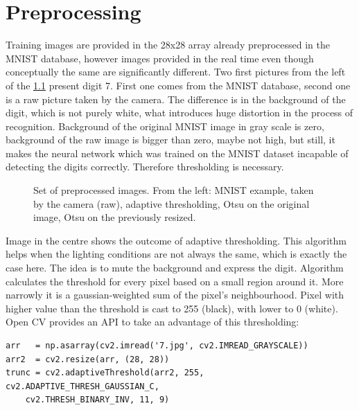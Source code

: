 \begingroup
\renewcommand{\cleardoublepage}{}
\renewcommand{\clearpage}{}
\chapter{Preprocessing}
\endgroup
Training images are provided in the 28x28 array already preprocessed in the MNIST database, however images provided in the real time even though conceptually the same are significantly different. Two first pictures from the left of the \figurename{} \ref{fig:7_images} present digit 7. First one comes from the MNIST database, second one is a raw picture taken by the camera. The difference is in the background of the digit, which is not purely white, what introduces huge distortion in the process of recognition. Background of the original MNIST image in gray scale is zero, background of the raw image is bigger than zero, maybe not high, but still, it makes the neural network which was trained on the MNIST dataset incapable of detecting the digits correctly. Therefore thresholding is necessary.
\begin{figure}[H]
	\begin{center}
	\end{center}
	\caption{Set of preprocessed images. From the left: MNIST example, taken by the camera (raw), adaptive thresholding, Otsu on the original image, Otsu on the previously resized.}
	\label{fig:7_images}
\end{figure}
Image in the centre shows the outcome of adaptive thresholding. This algorithm helps when the lighting conditions are not always the same, which is exactly the case here. The idea is to mute the background and express the digit. Algorithm calculates the threshold for every pixel based on a small region around it. More narrowly it is a gaussian-weighted sum of the pixel's neighbourhood. Pixel with higher value than the threshold is cast to 255 (black), with lower to 0 (white). Open CV provides an API to take an advantage of this thresholding:
\begin{verbatim}
arr   = np.asarray(cv2.imread('7.jpg', cv2.IMREAD_GRAYSCALE))
arr2  = cv2.resize(arr, (28, 28))
trunc = cv2.adaptiveThreshold(arr2, 255, cv2.ADAPTIVE_THRESH_GAUSSIAN_C, 
    cv2.THRESH_BINARY_INV, 11, 9)
\end{verbatim}

